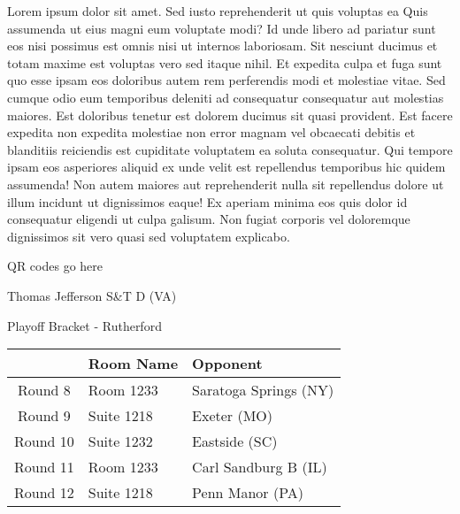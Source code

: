 \documentclass{article}%
\begin{document}
\vspace*{8pt}%
\linebreak%
\newline%
\newline%
Lorem ipsum dolor sit amet. Sed iusto reprehenderit ut quis voluptas ea Quis assumenda ut eius magni eum voluptate modi? Id unde libero ad pariatur sunt eos nisi possimus est omnis nisi ut internos laboriosam. Sit nesciunt ducimus et totam maxime est voluptas vero sed itaque nihil. Et expedita culpa et fuga sunt quo esse ipsam eos doloribus autem rem perferendis modi et molestiae vitae.\newline%
\newline%
Sed cumque odio eum temporibus deleniti ad consequatur consequatur aut molestias maiores. Est doloribus tenetur est dolorem ducimus sit quasi provident. Est facere expedita non expedita molestiae non error magnam vel obcaecati debitis et blanditiis reiciendis est cupiditate voluptatem ea soluta consequatur. Qui tempore ipsam eos asperiores aliquid ex unde velit est repellendus temporibus hic quidem assumenda!\newline%
\newline%
Non autem maiores aut reprehenderit nulla sit repellendus dolore ut illum incidunt ut dignissimos eaque! Ex aperiam minima eos quis dolor id consequatur eligendi ut culpa galisum. Non fugiat corporis vel doloremque dignissimos sit vero quasi sed voluptatem explicabo.\newline%
\newline%
%
\vspace*{30pt}%
\begin{center}%
\begin{Huge}%
QR codes go here%
\end{Huge}%
\end{center}%
\newpage%
\begin{center}%
\begin{Huge}%
Thomas Jefferson S\&T D (VA)%
\end{Huge}%
\vspace*{8pt}%
\linebreak%
\begin{Large}%
Playoff Bracket {-} Rutherford%
\end{Large}%
\end{center}%
%
\begin{tabularx}{\textwidth}{|c|Y|Y|}%
\hline%
&Room Name&Opponent\\%
\hline%
Round 8&Room 1233&Saratoga Springs (NY)\\%
Round 9&Suite 1218&Exeter (MO)\\%
Round 10&Suite 1232&Eastside (SC)\\%
Round 11&Room 1233&Carl Sandburg B (IL)\\%
Round 12&Suite 1218&Penn Manor (PA)\\%
\hline%
\end{tabularx}%
\end{document}
